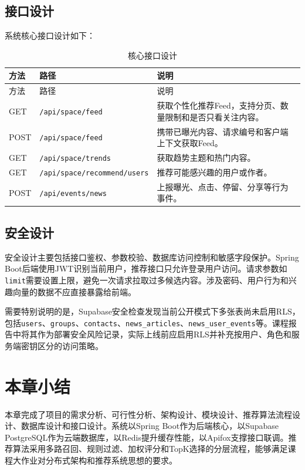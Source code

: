 \subsection{接口设计}

系统核心接口设计如下：

\begin{longtable}{L{0.13\textwidth}L{0.34\textwidth}L{0.41\textwidth}}
  \caption{核心接口设计}                                                             \\
  \toprule
  方法   & 路径                                  & 说明                              \\
  \midrule
  \endfirsthead
  \toprule
  方法   & 路径                                  & 说明                              \\
  \midrule
  \endhead
  GET  & \texttt{/api/space/feed}            & 获取个性化推荐Feed，支持分页、数量限制和是否只看关注内容。 \\
  POST & \texttt{/api/space/feed}            & 携带已曝光内容、请求编号和客户端上下文获取Feed。      \\
  GET  & \texttt{/api/space/trends}          & 获取趋势主题和热门内容。                    \\
  GET  & \texttt{/api/space/recommend/users} & 推荐可能感兴趣的用户或作者。                  \\
  POST & \texttt{/api/events/news}           & 上报曝光、点击、停留、分享等行为事件。             \\
  \bottomrule
\end{longtable}

\subsection{安全设计}

安全设计主要包括接口鉴权、参数校验、数据库访问控制和敏感字段保护。Spring Boot后端使用JWT识别当前用户，推荐接口只允许登录用户访问。请求参数如\texttt{limit}需要设置上限，避免一次请求拉取过多候选内容。涉及密码、用户行为和兴趣向量的数据不应直接暴露给前端。

需要特别说明的是，Supabase安全检查发现当前公开模式下多张表尚未启用RLS，包括\texttt{users}、\texttt{groups}、\texttt{contacts}、\texttt{news\_articles}、\texttt{news\_user\_events}等。课程报告中将其作为部署安全风险记录，实际上线前应启用RLS并补充按用户、角色和服务端密钥区分的访问策略。

\section{本章小结}

本章完成了项目的需求分析、可行性分析、架构设计、模块设计、推荐算法流程设计、数据库设计和接口设计。系统以Spring Boot作为后端核心，以Supabase PostgreSQL作为云端数据库，以Redis提升缓存性能，以Apifox支撑接口联调。推荐算法采用多路召回、规则过滤、加权评分和TopK选择的分层流程，能够满足课程大作业对分布式架构和推荐系统思想的要求。

